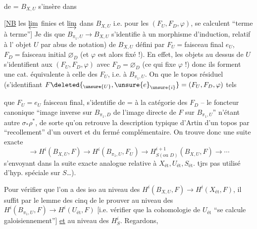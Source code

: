 de = $B_{X,U}$ s'insère dans

[\uline{NB} les $\varprojlim$ finies et $\varinjlim$ 
dans $B_{X,U}$ i.e. pour les $(F_U,F_D,\varphi)$, se
calculent ``terme à terme''] Je dis
que $B_{\pi_1,U}\longrightarrow B_{X,U}$ s'identifie à un
morphisme d'induction, relatif à l'
objet   $U$ par abus de notation)
de $B_{X,U}$ défini par
$F_U={}$faisceau final $e_U$, $F_D={}$faisceau initial $\varnothing_D$
(et $\varphi$ est alors fixé !). En effet, les
objets  au dessus de $U$ s'identifient aux
$(F_U,F_D,\varphi)$ avec $F_D=\varnothing_D$ (ce qui fixe $\varphi$ !) donc
ils forment une cat. équivalente à celle des
$F_U$, i.e. à $B_{\pi_1,U}$. On  que le topos
résiduel (s'identifiant   $F\deleted{_{\unsure{U}},\unsure{e}_{\unsure{i}}}=(F_U,F_D,\varphi)$ tels

que $F_U=e_U$ faisceau final, s'identifie de = à la
catégorie  des $F_D$  -- le foncteur
canonique ``image inverse sur $B_{\pi_1,D}$ de l'image
directe de $F$ sur $B_{\pi_1,U}$'' n'étant autre
$\sigma_*\rho^*$, de sorte qu'on retrouve la description
 typique d'Artin d'un topos 
par ``recollement'' d'un  ouvert et du
fermé complémentaire.
On trouve donc une suite exacte
\[
\longrightarrow H^i(B_{X,U},F)\longrightarrow
H^i(B_{\pi_1,U},F_U)\longrightarrow
H^{i+1}_{S(\text{ou }D)}(B_{X,U},F)\longrightarrow\cdots
\]
s'envoyant dans la suite exacte analogue
relative à $X_{\mathrm{ét}},U_{\mathrm{ét}},S_{\mathrm{ét}}$.  
tjrs pas utilisé d'hyp. spéciale sur $S$\ldots).

Pour vérifier que l'on a des iso
au niveau des $H^i(B_{X,U},F)\longrightarrow H^i(X_{\mathrm{ét}},F)$,
il suffit par le lemme des cinq de
le prouver au niveau des
$H^i(B_{\pi_1,U},F)\longrightarrow H^i(U_{\mathrm{ét}},F)$ [i.e. vérifier que la
cohomologie de $U_{\mathrm{ét}}$ ``se calcule galoisiennement'']
\uline{et} au niveau des $H^i_S$.  Regardons,

